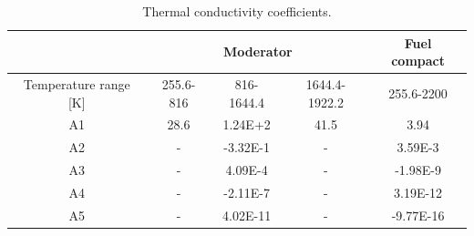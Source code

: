 \begin{table}[htbp!]
\centering
  \caption{Thermal conductivity coefficients.}
  \label{tab:th-val-assem-mat} 
  \begin{tabular}{c|ccc|c}
\toprule
                          & \multicolumn{3}{c|}{Moderator}         & Fuel compact \\ \hline
Temperature range {[}K{]} & 255.6-816 & 816-1644.4 & 1644.4-1922.2 & 255.6-2200   \\
\midrule
A1                        & 28.6      & 1.24E+2    & 41.5          & 3.94         \\
A2                        & -         & -3.32E-1   & -             & 3.59E-3      \\
A3                        & -         & 4.09E-4    & -             & -1.98E-9     \\
A4                        & -         & -2.11E-7   & -             & 3.19E-12     \\
A5                        & -         & 4.02E-11   & -             & -9.77E-16    \\
\bottomrule
  \end{tabular}
\end{table}

\begin{figure}[htbp!]
  \centering
  \hfill
  \label{fig:th-val-assem-model}
\end{figure}

